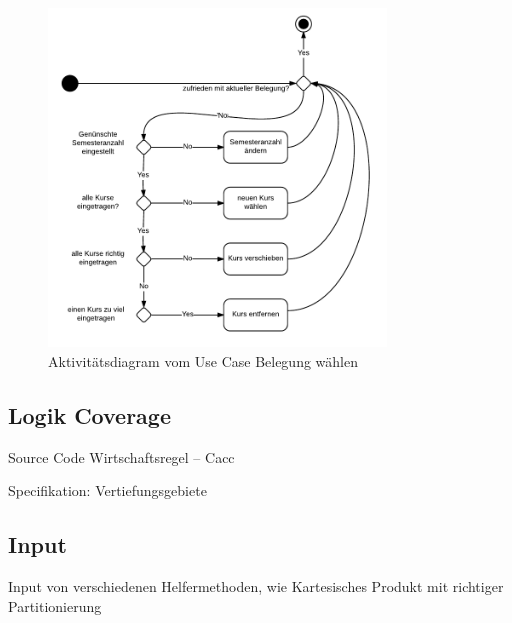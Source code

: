 \documentclass[ngerman]{article}
\begin{document}
\begin{figure}

\includegraphics[width=0.8\textwidth]{figures/180_Belegungaendern_aktivitaet.pdf}
\caption{Aktivitätsdiagram vom Use Case Belegung wählen}
\end{figure}

\subsection{Logik Coverage}
Source Code
Wirtschaftsregel -- Cacc

Specifikation: Vertiefungsgebiete 


\subsection{Input}
Input von verschiedenen Helfermethoden, wie Kartesisches Produkt mit richtiger Partitionierung
\end{document}
